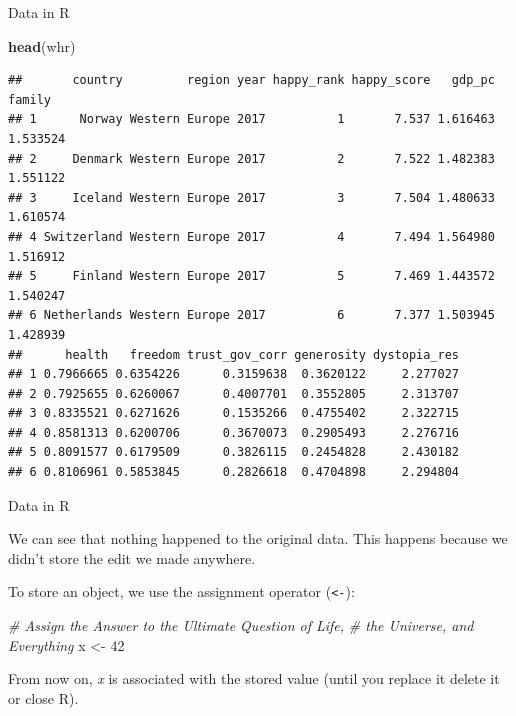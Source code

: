 \documentclass[ignorenonframetext,]{beamer}
\newenvironment{Shaded}{\begin{snugshade}}{\end{snugshade}}
\newcommand{\KeywordTok}[1]{\textcolor[rgb]{0.13,0.29,0.53}{\textbf{#1}}}
\newcommand{\DecValTok}[1]{\textcolor[rgb]{0.00,0.00,0.81}{#1}}
\newcommand{\StringTok}[1]{\textcolor[rgb]{0.31,0.60,0.02}{#1}}
\newcommand{\CommentTok}[1]{\textcolor[rgb]{0.56,0.35,0.01}{\textit{#1}}}
\newcommand{\NormalTok}[1]{#1}
\begin{document}
\begin{frame}[fragile]{Data in R}

\scriptsize

\begin{Shaded}
\begin{Highlighting}[]
\KeywordTok{head}\NormalTok{(whr)}
\end{Highlighting}
\end{Shaded}

\begin{verbatim}
##       country         region year happy_rank happy_score   gdp_pc   family
## 1      Norway Western Europe 2017          1       7.537 1.616463 1.533524
## 2     Denmark Western Europe 2017          2       7.522 1.482383 1.551122
## 3     Iceland Western Europe 2017          3       7.504 1.480633 1.610574
## 4 Switzerland Western Europe 2017          4       7.494 1.564980 1.516912
## 5     Finland Western Europe 2017          5       7.469 1.443572 1.540247
## 6 Netherlands Western Europe 2017          6       7.377 1.503945 1.428939
##      health   freedom trust_gov_corr generosity dystopia_res
## 1 0.7966665 0.6354226      0.3159638  0.3620122     2.277027
## 2 0.7925655 0.6260067      0.4007701  0.3552805     2.313707
## 3 0.8335521 0.6271626      0.1535266  0.4755402     2.322715
## 4 0.8581313 0.6200706      0.3670073  0.2905493     2.276716
## 5 0.8091577 0.6179509      0.3826115  0.2454828     2.430182
## 6 0.8106961 0.5853845      0.2826618  0.4704898     2.294804
\end{verbatim}

\end{frame}

\begin{frame}[fragile]{Data in R}

We can see that nothing happened to the original data. This happens
because we didn't store the edit we made anywhere.

\begin{block}{To store an object, we use the assignment operator
(\texttt{\textless{}-}):}

\begin{Shaded}
\begin{Highlighting}[]
\CommentTok{# Assign the Answer to the Ultimate Question of Life, }
\CommentTok{# the Universe, and Everything}
\NormalTok{x <-}\StringTok{ }\DecValTok{42}
\end{Highlighting}
\end{Shaded}

From now on, \emph{x} is associated with the stored value (until you
replace it delete it or close R).

\end{block}

\end{frame}
\end{document}
